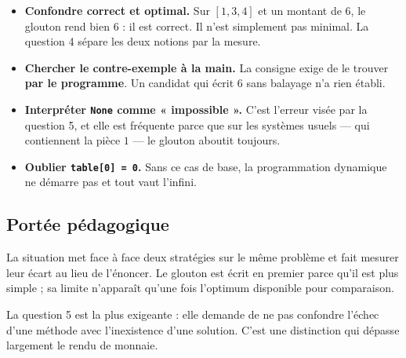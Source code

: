 \begin{itemize}
  \item \textbf{Confondre correct et optimal.} Sur $[1, 3, 4]$ et un montant de
    $6$, le glouton rend bien $6$ : il est correct. Il n'est simplement pas
    minimal. La question 4 sépare les deux notions par la mesure.
  \item \textbf{Chercher le contre-exemple à la main.} La consigne exige de le
    trouver \textbf{par le programme}. Un candidat qui écrit $6$ sans balayage
    n'a rien établi.
  \item \textbf{Interpréter \lstinline{None} comme « impossible ».} C'est
    l'erreur visée par la question 5, et elle est fréquente parce que sur les
    systèmes usuels — qui contiennent la pièce $1$ — le glouton aboutit
    toujours.
  \item \textbf{Oublier \lstinline{table[0] = 0}.} Sans ce cas de base, la
    programmation dynamique ne démarre pas et tout vaut l'infini.
\end{itemize}

\subsection*{Portée pédagogique}

La situation met face à face deux stratégies sur le même problème et fait
mesurer leur écart au lieu de l'énoncer. Le glouton est écrit en premier parce
qu'il est plus simple ; sa limite n'apparaît qu'une fois l'optimum disponible
pour comparaison.

La question 5 est la plus exigeante : elle demande de ne pas confondre l'échec
d'une méthode avec l'inexistence d'une solution. C'est une distinction qui
dépasse largement le rendu de monnaie.
